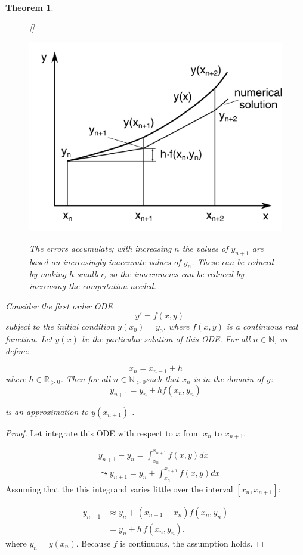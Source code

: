 \documentclass{article}
\newtheorem{theorem}{Theorem}
\begin{document}
	\begin{theorem}
		\begin{figure}
			\centering		
			[\FBwidth]
			{\caption{The errors accumulate; with increasing $n$ the values of $y_{n+1}$ are based on increasingly inaccurate values of $y_{n}$. These can be reduced by making $h$ smaller, so the inaccuracies can be reduced by increasing the computation needed. }}
			{\includegraphics[width=.5\textwidth]{images/euler}}
			\label{fig:euler}
			
		\end{figure}	
		Consider the first order ODE
		\begin{equation*}
		\quad y' = f(x, y)
		\end{equation*}
		subject to the initial condition $y(x_0) = y_0$. where $f(x,y)$ is a continuous real function. Let $y(x)$ be the particular solution of this ODE. For all $n \in \mathbb{N}$, we define:
		
		\begin{equation*}
		x_n = x_{n - 1} + h
		\end{equation*}
		where $h \in \mathbb{R}_{>0}$. Then for all $n \in \mathbb{N}_{>0}$such that $x_n$ is in the domain of $y$:
		\begin{equation}
		y_{n + 1} = y_n + h f (x_n, y_n)
		\end{equation}
		
		is an approximation to $y (x_{n + 1} )$ \cite{eulermethod}.
	\end{theorem}
	\begin{proof}
		Let integrate this ODE with respect to $x$ from $x_n$ to $x_{n+1}$.
		
		\begin{align*}
		&y _{n+1} - y _{n} = \int_{x_{n}}^{x_{n+1}} f (x, y) dx \\
		& \leadsto  y _{n+1} = y_{n} + \int_{x_{n}}^{x_{n+1}} f (x, y) d x
		\end{align*}
		Assuming that the this integrand varies little over the interval $[x_{n}, x_{n+1}]$:
		
		\begin{align*}
		y_{n+1} &\approx y_{n} + (x_{n+1} - x_{n}) f(x_{n}, y_{n}) \\
		&= y_n + h \, f (x_n, y_n).
		\end{align*}
		where $y_n = y(x_n)$. Because $f$ is continuous, the assumption holds. 
	\end{proof}
\end{document}
